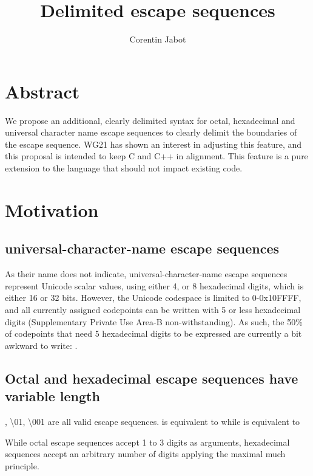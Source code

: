 \documentclass{wg21}
\title{Delimited escape sequences}
\author{Corentin Jabot}{corentin.jabot@gmail.com}
\begin{document}
\maketitle

\paperquote{}

\section{Abstract}

We propose an additional, clearly delimited syntax for octal, hexadecimal and universal character name escape sequences to clearly delimit the boundaries of the escape sequence. WG21 has shown an interest in adjusting this feature, and this proposal is intended to keep C and C++ in alignment. This feature is a pure extension to the language that should not impact existing code.


\section{Motivation}

\subsection{universal-character-name escape sequences}

As their name does not indicate, universal-character-name escape sequences represent Unicode scalar values,
using either 4, or 8 hexadecimal digits, which is either 16 or 32 bits.
However, the Unicode codespace is limited to 0-0x10FFFF, and all currently assigned codepoints can be written with 5 or less
hexadecimal digits (Supplementary Private Use Area-B non-withstanding).
As such, the \~50\% of codepoints that need 5 hexadecimal digits to be expressed are currently a bit awkward to write: .

\subsection{Octal and hexadecimal escape sequences have variable length}

, {\textbackslash 01}, {\textbackslash 001} are all valid escape sequences.
 is equivalent to  while  is equivalent to 

While octal escape sequences accept 1 to 3 digits as arguments, hexadecimal sequences accept an arbitrary number of digits
applying the maximal much principle.
\end{document}
